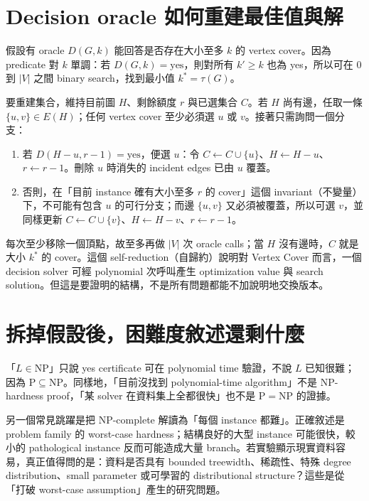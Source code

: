 \documentclass[11pt,a4paper,oneside,openany]{book}
\begin{document}
\section{Decision oracle 如何重建最佳值與解}
假設有 oracle $D(G,k)$ 能回答是否存在大小至多 $k$ 的 vertex cover。因為 predicate 對 $k$ 單調：若 $D(G,k)=\text{yes}$，則對所有 $k'\ge k$ 也為 yes，所以可在 $0$ 到 $|V|$ 之間 binary search，找到最小值 $k^*=\tau(G)$。

要重建集合，維持目前圖 $H$、剩餘額度 $r$ 與已選集合 $C$。若 $H$ 尚有邊，任取一條 $\{u,v\}\in E(H)$；任何 vertex cover 至少必須選 $u$ 或 $v$。接著只需詢問一個分支：
\begin{enumerate}
\item 若 $D(H-u,r-1)=\text{yes}$，便選 $u$：令 $C\leftarrow C\cup\{u\}$、$H\leftarrow H-u$、$r\leftarrow r-1$。刪除 $u$ 時消失的 incident edges 已由 $u$ 覆蓋。
\item 否則，在「目前 instance 確有大小至多 $r$ 的 cover」這個 invariant（不變量）下，不可能有包含 $u$ 的可行分支；而邊 $\{u,v\}$ 又必須被覆蓋，所以可選 $v$，並同樣更新 $C\leftarrow C\cup\{v\}$、$H\leftarrow H-v$、$r\leftarrow r-1$。
\end{enumerate}
每次至少移除一個頂點，故至多再做 $|V|$ 次 oracle calls；當 $H$ 沒有邊時，$C$ 就是大小 $k^*$ 的 cover。這個 self-reduction（自歸約）說明對 Vertex Cover 而言，一個 decision solver 可經 polynomial 次呼叫產生 optimization value 與 search solution。但這是要證明的結構，不是所有問題都能不加說明地交換版本。

\section{拆掉假設後，困難度敘述還剩什麼}
\begin{misconception}
「$L\in\mathrm{NP}$」只說 yes certificate 可在 polynomial time 驗證，不說 $L$ 已知很難；因為 $\mathrm P\subseteq\mathrm{NP}$。同樣地，「目前沒找到 polynomial-time algorithm」不是 NP-hardness proof，「某 solver 在資料集上全都很快」也不是 $\mathrm P=\mathrm{NP}$ 的證據。
\end{misconception}

另一個常見跳躍是把 NP-complete 解讀為「每個 instance 都難」。正確敘述是 problem family 的 worst-case hardness；結構良好的大型 instance 可能很快，較小的 pathological instance 反而可能造成大量 branch。若實驗顯示現實資料容易，真正值得問的是：資料是否具有 bounded treewidth、稀疏性、特殊 degree distribution、small parameter 或可學習的 distributional structure？這些是從「打破 worst-case assumption」產生的研究問題。
\end{document}
